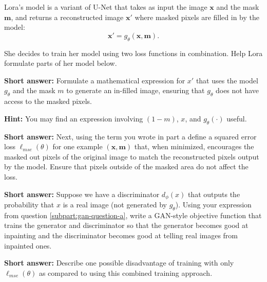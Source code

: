 \documentclass[11pt,addpoints,answers]{exam}
\newcommand{\mv}{\mathbf{m}}
\newcommand{\xv}{\mathbf{x}}
\begin{document}
\begin{questions}
\begin{parts}
Lora's model is a variant of U-Net that takes as input the image $\xv$ and the mask $\mv$, and returns a reconstructed image $\xv'$ where masked pixels are filled in by the model:
\[
\xv' = g_{\theta}(\xv, \mv).
\]

She decides to train her model using two loss functions in combination. Help Lora formulate parts of her model below.


\begin{subparts}

\subpart[1] \textbf{Short answer:} Formulate a mathematical expression for \( x' \) that uses the model \( g_\theta \) and the mask \( m \) to generate an in-filled image, ensuring that \( g_\theta \) does not have access to the masked pixels.

\textbf{Hint:} You may find an expression involving \( (1 - m) \), \( x \), and \( g_\theta(\cdot) \) useful.



\label{subpart:gan-question-a}
    \begin{answer_box}[title=,height=2cm, width=14cm]
    \end{answer_box}

\subpart[1] \textbf{Short answer:} Next, using the term you wrote in part a define a squared error loss $\ell_{mse}(\theta)$ for one example $(\xv, \mv)$ that, when minimized, encourages the masked out pixels of the original image to match the reconstructed pixels output by the model. Ensure that pixels outside of the masked area do not affect the loss.
    \begin{answer_box}[title=,height=2cm, width=14cm]
    \end{answer_box}
    
\subpart[2] \textbf{Short answer:} Suppose we have a discriminator \( d_\phi(x) \) that outputs the probability that \( x \) is a real image (not generated by \( g_\theta \)). Using your expression from question \ref{subpart:gan-question-a}, write a GAN-style objective function that trains the generator and discriminator so that the generator becomes good at inpainting and the discriminator becomes good at telling real images from inpainted ones.


    \begin{answer_box}[title=,height=2cm, width=14cm]
    \end{answer_box}
    
\subpart[1] \textbf{Short answer:} Describe one possible disadvantage of training with only $\ell_{mse}(\theta)$ as compared to using this combined training approach.
    \begin{answer_box}[title=,height=4cm, width=14cm]
    \end{answer_box}
    

\end{subparts}
\end{parts}
\end{questions}
\end{document}

